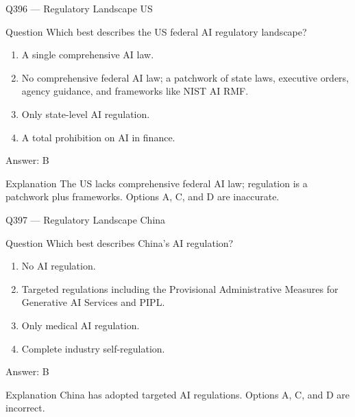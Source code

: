 \documentclass[aspectratio=169,8pt]{beamer}
\begin{document}
	\begin{frame}{Q396 --- Regulatory Landscape US}
		\begin{block}{Question}
			Which best describes the US federal AI regulatory landscape?
			\begin{enumerate}
				\item A single comprehensive AI law.
				\item No comprehensive federal AI law; a patchwork of state laws, executive orders, agency guidance, and frameworks like NIST AI RMF.
				\item Only state-level AI regulation.
				\item A total prohibition on AI in finance.
			\end{enumerate}
		\end{block}
		\begin{exampleblock}{Answer: B}\end{exampleblock}
		\begin{block}{Explanation}
			The US lacks comprehensive federal AI law; regulation is a patchwork plus frameworks. Options A, C, and D are inaccurate.
		\end{block}
	\end{frame}
	
	\begin{frame}{Q397 --- Regulatory Landscape China}
		\begin{block}{Question}
			Which best describes China's AI regulation?
			\begin{enumerate}
				\item No AI regulation.
				\item Targeted regulations including the Provisional Administrative Measures for Generative AI Services and PIPL.
				\item Only medical AI regulation.
				\item Complete industry self-regulation.
			\end{enumerate}
		\end{block}
		\begin{exampleblock}{Answer: B}\end{exampleblock}
		\begin{block}{Explanation}
			China has adopted targeted AI regulations. Options A, C, and D are incorrect.
		\end{block}
	\end{frame}
	
\end{document}
